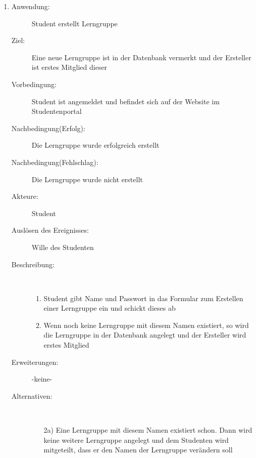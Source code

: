 \documentclass[parskip=full]{scrartcl}
\newcommand{\swtLabel}[1]{\textbf{\textbackslash #1\arabic*0\textbackslash}}
\begin{document}
\begin{enumerate}[label=\swtLabel{S}]
  
  \item
  \begin{description}
  \item[Anwendung:] Student erstellt Lerngruppe
  \item[Ziel:] Eine neue Lerngruppe ist in der Datenbank vermerkt und der Ersteller ist erstes Mitglied dieser
  	\item[Vorbedingung:] Student ist angemeldet und befindet sich auf der Website im Studentenportal
  	\item[Nachbedingung(Erfolg):] Die Lerngruppe wurde erfolgreich erstellt
  	\item[Nachbedingung(Fehlschlag):] Die Lerngruppe wurde nicht erstellt
  	\item[Akteure:] Student
  	\item[Auslösen des Ereignisses:] Wille des Studenten
  	\item[Beschreibung:]~
  	\begin{enumerate}
  	  \item Student gibt Name und Passwort in das Formular zum Erstellen einer
  	  Lerngruppe ein und schickt dieses ab
  	  \item Wenn noch keine Lerngruppe mit diesem Namen existiert, so wird die
  	  Lerngruppe in der Datenbank angelegt und der Ersteller wird erstes Mitglied
  	\end{enumerate}
  	\item[Erweiterungen:] -keine-
  	\item[Alternativen:] ~
  	\begin{enumerate}
  	  \item[2a)] Eine Lerngruppe mit diesem Namen existiert schon. Dann wird
  	  keine weitere Lerngruppe angelegt und dem Studenten wird mitgeteilt, dass er den Namen der Lerngruppe verändern soll
  	 \end{enumerate}  
  \end{description}
   

\end{enumerate}
\end{document}

